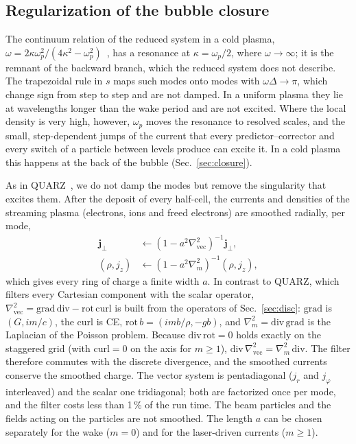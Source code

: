 \documentclass[aps,prab,reprint,floatfix,superscriptaddress,amsmath,amssymb]{revtex4-2}
\begin{document}
\subsection{Regularization of the bubble closure}\label{sec:smooth}

The continuum relation of the reduced system in a cold plasma, $\omega = 2\kappa\omega_p^2/(4\kappa^2 - \omega_p^2)$~\cite{GEMPIC}, has a resonance at $\kappa = \omega_p/2$, where $\omega \to \infty$; it is the remnant of the backward branch, which the reduced system does not describe. The trapezoidal rule in $s$ maps such modes onto modes with $\omega\Delta \to \pi$, which change sign from step to step and are not damped. In a uniform plasma they lie at wavelengths longer than the wake period and are not excited. Where the local density is very high, however, $\omega_p$ moves the resonance to resolved scales, and the small, step-dependent jumps of the current that every predictor--corrector and every switch of a particle between levels produce can excite it. In a cold plasma this happens at the back of the bubble (Sec.~\ref{sec:closure}).

As in QUARZ~\cite{QUARZ}, we do not damp the modes but remove the singularity that excites them. After the deposit of every half-cell, the currents and densities of the streaming plasma (electrons, ions and freed electrons) are smoothed radially, per mode,
\begin{align}
\bm j_\perp &\leftarrow (1 - a^2\nabla^2_\mathrm{vec})^{-1}\bm j_\perp, \nonumber\\
(\rho, j_z) &\leftarrow (1 - a^2\nabla^2_m)^{-1}(\rho, j_z), \label{eq:smooth}
\end{align}
which gives every ring of charge a finite width $a$. In contrast to QUARZ, which filters every Cartesian component with the scalar operator, $\nabla^2_\mathrm{vec} = \mathrm{grad}\,\mathrm{div} - \mathrm{rot}\,\mathrm{curl}$ is built from the operators of Sec.~\ref{sec:disc}: $\mathrm{grad}$ is $(G, im/c)$, the curl is CE, $\mathrm{rot}\,b = (im b/\rho, -g b)$, and $\nabla^2_m = \mathrm{div}\,\mathrm{grad}$ is the Laplacian of the Poisson problem. Because $\mathrm{div}\,\mathrm{rot} = 0$ holds exactly on the staggered grid (with $\mathrm{curl} = 0$ on the axis for $m \ge 1$), $\mathrm{div}\,\nabla^2_\mathrm{vec} = \nabla^2_m\,\mathrm{div}$. The filter therefore commutes with the discrete divergence, and the smoothed currents conserve the smoothed charge. The vector system is pentadiagonal ($j_r$ and $j_\varphi$ interleaved) and the scalar one tridiagonal; both are factorized once per mode, and the filter costs less than 1\,\% of the run time. The beam particles and the fields acting on the particles are not smoothed. The length $a$ can be chosen separately for the wake ($m = 0$) and for the laser-driven currents ($m \ge 1$).
\end{document}
